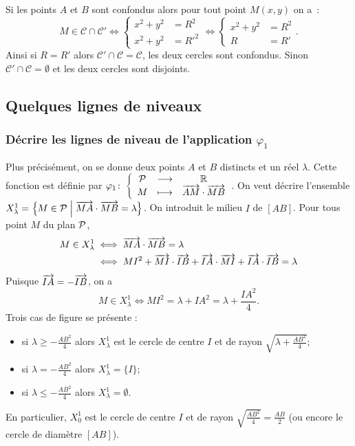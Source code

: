 Si les points $A$ et $B$ sont confondus alors pour tout point $M(x,y)$ on a~:
\begin{equation}
  M \in \mathcal{C} \cap \mathcal{C}' \iff \begin{cases} x^2+y^2 & =R^2 \\ x^2+y^2&=R'^2 \end{cases} \iff \begin{cases} x^2+y^2 & =R^2 \\ R&=R' \end{cases}.
\end{equation}
Ainsi si $R=R'$ alors $\mathcal{C}' \cap \mathcal{C}=\mathcal{C}$, les deux cercles sont confondus. Sinon $\mathcal{C}' \cap \mathcal{C}=\emptyset$ et les deux cercles sont disjoints.

\subsection{Quelques lignes de niveaux}
\subsubsection{Décrire les lignes de niveau de l'application $\varphi_1$}
Plus précisément, on se  donne deux points $A$ et $B$ distincts et un réel $\lambda$. Cette fonction est définie par $\fonction{\varphi_1}{\P}{\R}{M}{\vect{AM} \cdot \vect{MB}}$. On veut décrire l'ensemble $X_{\lambda}^{1}=\enstq{M \in \P}{\vect{MA} \cdot \vect{MB} = \lambda}$. On introduit le milieu $I$ de $[AB]$. Pour tous point $M$ du plan $\P$,
\begin{align}
  M \in X_{\lambda}^{1} & \iff \vect{MA} \cdot \vect{MB} = \lambda \\ & \iff MI^2 + \vect{MI} \cdot \vect{IB} + \vect{IA} \cdot \vect{MI} + \vect{IA} \cdot \vect{IB} = \lambda
\end{align}
Puisque $\vect{IA}=-\vect{IB}$, on a 
\begin{equation}
  M \in X_{\lambda}^{1}  \iff MI^2=\lambda + IA^2=\lambda + \frac{IA^2}{4}.
\end{equation}
Trois cas de figure se présente :
\begin{itemize}
\item si $\lambda \geqslant -\frac{AB^2}{4}$ alors $X_{\lambda}^{1}$ est le cercle de centre $I$ et de rayon $\sqrt{\lambda +\frac{AB^2}{4}}$;
\item si $\lambda = -\frac{AB^2}{4}$ alors $X_{\lambda}^{1}=\{I\}$;
\item si $\lambda \leqslant -\frac{AB^2}{4}$ alors $X_{\lambda}^{1}=\emptyset$.
\end{itemize}
En particulier, $X_{0}^{1}$ est le cercle de centre $I$ et de rayon $\sqrt{\frac{AB^2}{4}}=\frac{AB}{2}$ (ou encore le cercle de diamètre $[AB]$).

